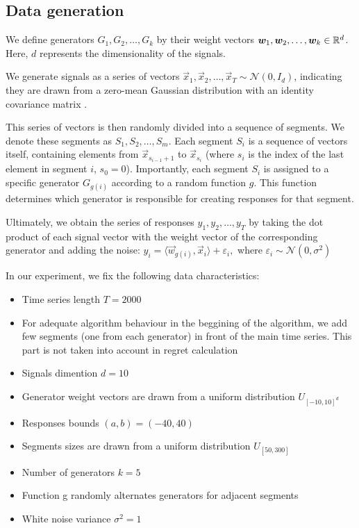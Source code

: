 \documentclass[12pt, twoside]{article}
\begin{document}
\subsection{Data generation}

We define generators $G_1, G_2, \dots, G_k$ by their weight vectors $\boldsymbol{w}_1, \boldsymbol{w}_2, \dots, \boldsymbol{w}_k \in \mathbb{R}^d$. 
Here, $d$ represents the dimensionality of the signals.

We generate signals as a series of vectors $\vec x_1, \vec x_2, \dots, \vec x_T \sim \mathcal{N}(0, I_d)$, indicating they are drawn from a zero-mean Gaussian distribution with an identity covariance matrix .

This series of vectors is then randomly divided into a sequence of segments. 
We denote these segments as $S_1, S_2, \dots, S_m$. 
Each segment $S_i$ is a sequence of vectors itself, containing elements from $\vec x_{s_{i-1}+1}$ to $\vec x_{s_i}$ (where $s_i$ is the index of the last element in segment $i$, $s_0 = 0$). 
Importantly, each segment $S_i$ is assigned to a specific generator $G_{g(i)}$ according to a random function $g$. 
This function determines which generator is responsible for creating responses for that segment.

Ultimately, we obtain the series of responses $y_1, y_2, \dots, y_T$ by taking the dot product of each signal vector with the weight vector of the corresponding  generator and adding the noise: $y_i = \langle \vec w_{g(i)}, \vec x_i \rangle + \varepsilon_i,$ where $\varepsilon_i \sim \mathcal{N}(0, \sigma^2)$ 

\vspace{2mm}

In our experiment, we fix the following data characteristics:
\begin{itemize}
\item Time series length $T = 2000$
\item For adequate algorithm behaviour in the beggining of the algorithm, 
we add few segments (one from each generator) in front of the main time series. This part is not taken into account in regret calculation
\item Signals dimention $d=10$
\item Generator weight vectors are drawn from a uniform distribution $U_{[-10, 10]^d}$
\item Responses bounds $(a, b) = (-40, 40)$
\item Segments sizes are drawn from a uniform distribution $U_{[50, 300]}$
\item Number of generators $k = 5$
\item Function g randomly alternates generators for adjacent segments
\item White noise variance $\sigma^2= 1$
\end{itemize}
\end{document}
